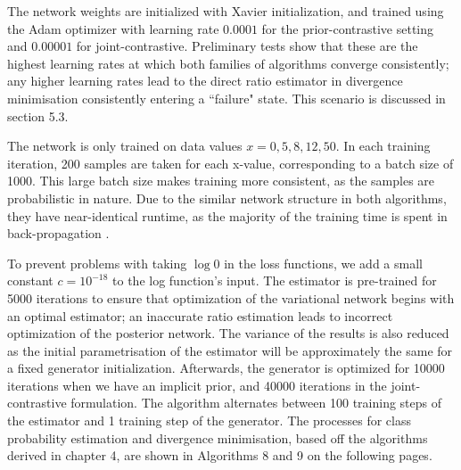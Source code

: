 \documentclass[honours,12pt]{unswthesis}
\numberwithin{equation}{section}
\theoremstyle{definition}
\begin{document}
\newpage
The network weights are initialized with Xavier initialization, and trained using the Adam optimizer with learning rate $0.0001$ for the prior-contrastive setting and $0.00001$ for joint-contrastive. Preliminary tests show that these are the highest learning rates at which both families of algorithms converge consistently; any higher learning rates lead to the direct ratio estimator in divergence minimisation consistently entering a ``failure" state. This scenario is discussed in section 5.3.

The network is only trained on data values $x=0,5,8,12,50$. In each training iteration, 200 samples are taken for each x-value, corresponding to a batch size of 1000. This large batch size makes training more consistent, as the samples are probabilistic in nature. Due to the similar network structure in both algorithms, they have near-identical runtime, as the majority of the training time is spent in back-propagation \citep{DeepLearning}.

To prevent problems with taking $\log 0$ in the loss functions, we add a small constant $c=10^{-18}$ to the log function's input. The estimator is pre-trained for 5000 iterations to ensure that optimization of the variational network begins with an optimal estimator; an inaccurate ratio estimation leads to incorrect optimization of the posterior network. The variance of the results is also reduced as the initial parametrisation of the estimator will be approximately the same for a fixed generator initialization. Afterwards, the generator is optimized for 10000 iterations when we have an implicit prior, and 40000 iterations in the joint-contrastive formulation. The algorithm alternates between 100 training steps of the estimator and 1 training step of the generator. The processes for class probability estimation and divergence minimisation, based off the algorithms derived in chapter 4, are shown in Algorithms 8 and 9 on the following pages.
\end{document}
